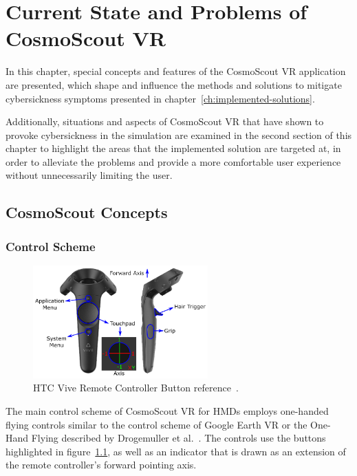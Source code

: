 \chapter{Current State and Problems of CosmoScout VR}\label{ch:current-state-and-problems-of-cosmoscout}

In this chapter, special concepts and features of the CosmoScout VR application are presented, which shape and
influence the methods and solutions to mitigate cybersickness symptoms presented in
chapter~\ref{ch:implemented-solutions}.

Additionally, situations and aspects of CosmoScout VR that have shown to provoke cybersickness in the simulation are
examined in the second section of this chapter to highlight the areas that the implemented solution are targeted at,
in order to alleviate the problems and provide a more comfortable user experience without unnecessarily limiting the
user.

\section{CosmoScout Concepts}\label{sec:cosmoscout-concepts}
\subsection{Control Scheme}\label{subsec:control-scheme}

\begin{figure}[h]
    \centering
    \includegraphics[width=0.6\textwidth]{content/3_current_state/img/ViveControllerButtons[BAA2017]}
    \caption{HTC Vive Remote Controller Button reference~\cite{BAA2017}.}
    \label{fig:controller-reference}
\end{figure}

The main control scheme of CosmoScout VR for HMDs employs one-handed flying controls similar to the control
scheme of Google Earth VR or the One-Hand Flying described by Drogemuller et al.~\cite{Drogemuller2020}.
The controls use the buttons highlighted in figure~\ref{fig:controller-reference}, as well as an indicator that is
drawn as an extension of the remote controller's forward pointing axis.

